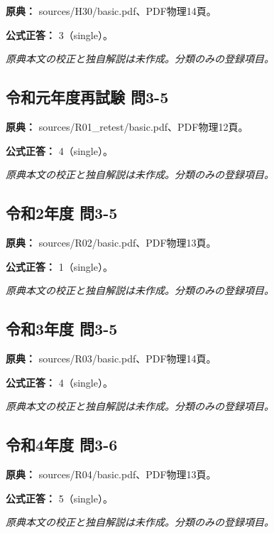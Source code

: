 \noindent\textbf{原典：} sources/H30/basic.pdf、PDF物理14頁。

\textbf{公式正答：} 3（single）。

\par\textit{原典本文の校正と独自解説は未作成。分類のみの登録項目。}

\subsection{令和元年度再試験 問3-5}
\label{q:r01-ret-basic-3-5}

\noindent\textbf{原典：} sources/R01\_retest/basic.pdf、PDF物理12頁。

\textbf{公式正答：} 4（single）。

\par\textit{原典本文の校正と独自解説は未作成。分類のみの登録項目。}

\subsection{令和2年度 問3-5}
\label{q:r02-reg-basic-3-5}

\noindent\textbf{原典：} sources/R02/basic.pdf、PDF物理13頁。

\textbf{公式正答：} 1（single）。

\par\textit{原典本文の校正と独自解説は未作成。分類のみの登録項目。}

\subsection{令和3年度 問3-5}
\label{q:r03-reg-basic-3-5}

\noindent\textbf{原典：} sources/R03/basic.pdf、PDF物理14頁。

\textbf{公式正答：} 4（single）。

\par\textit{原典本文の校正と独自解説は未作成。分類のみの登録項目。}

\subsection{令和4年度 問3-6}
\label{q:r04-reg-basic-3-6}

\noindent\textbf{原典：} sources/R04/basic.pdf、PDF物理13頁。

\textbf{公式正答：} 5（single）。

\par\textit{原典本文の校正と独自解説は未作成。分類のみの登録項目。}

